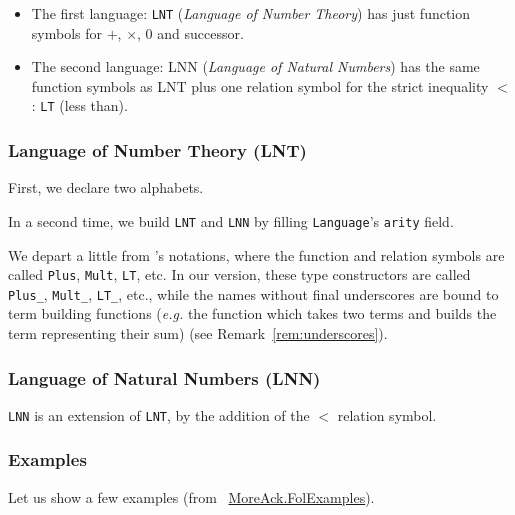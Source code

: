 \begin{itemize}
\item The first language: \texttt{LNT} (\emph{Language of Number Theory}) has just function symbols for $+$, $\times$, $0$ and successor.
\item The second language: LNN (\emph{Language of Natural Numbers})  has
the same function symbols as LNT plus one relation symbol for the strict inequality $<$ : \texttt{LT} (less than).
\end{itemize}

\subsubsection{Language of Number Theory (LNT)}

First, we declare two alphabets.


In a second time, we build \texttt{LNT} and \texttt{LNN} by filling \texttt{Language}'s \texttt{arity} field.


\begin{remark}
  We depart a little from \cite{Goedel}'s notations, where the 
function and relation symbols are called \texttt{Plus}, 
\texttt{Mult}, \texttt{LT}, etc. In our version, these type constructors are called \texttt{Plus\_}, 
\texttt{Mult\_}, \texttt{LT\_}, etc., while the names without final underscores are bound to term building functions (\emph{e.g.}
the function which takes two terms and builds the term representing their sum) (see Remark~\ref{rem:underscores}).
\end{remark}


\subsubsection{Language of Natural Numbers (LNN)}

\texttt{LNN} is an extension of \texttt{LNT}, by the addition 
of the $<$ relation symbol.





\subsubsection{Examples}

Let us show a few examples (from ~\href{../theories/html/hydras.MoreAck.FolExamples.html}{MoreAck.FolExamples}).

